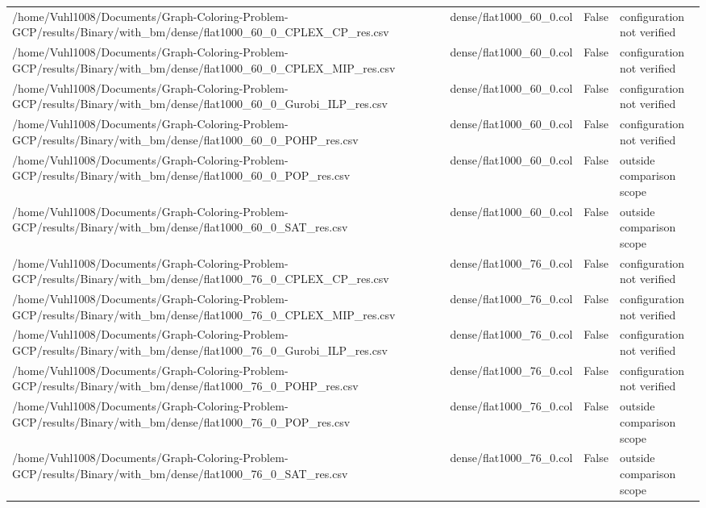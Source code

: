\begin{table}[htbp]
\begin{tabular}{llll}
/home/Vuhl1008/Documents/Graph-Coloring-Problem-GCP/results/Binary/with\_bm/dense/flat1000\_60\_0\_CPLEX\_CP\_res.csv & dense/flat1000\_60\_0.col & False & configuration not verified \\
/home/Vuhl1008/Documents/Graph-Coloring-Problem-GCP/results/Binary/with\_bm/dense/flat1000\_60\_0\_CPLEX\_MIP\_res.csv & dense/flat1000\_60\_0.col & False & configuration not verified \\
/home/Vuhl1008/Documents/Graph-Coloring-Problem-GCP/results/Binary/with\_bm/dense/flat1000\_60\_0\_Gurobi\_ILP\_res.csv & dense/flat1000\_60\_0.col & False & configuration not verified \\
/home/Vuhl1008/Documents/Graph-Coloring-Problem-GCP/results/Binary/with\_bm/dense/flat1000\_60\_0\_POHP\_res.csv & dense/flat1000\_60\_0.col & False & configuration not verified \\
/home/Vuhl1008/Documents/Graph-Coloring-Problem-GCP/results/Binary/with\_bm/dense/flat1000\_60\_0\_POP\_res.csv & dense/flat1000\_60\_0.col & False & outside comparison scope \\
/home/Vuhl1008/Documents/Graph-Coloring-Problem-GCP/results/Binary/with\_bm/dense/flat1000\_60\_0\_SAT\_res.csv & dense/flat1000\_60\_0.col & False & outside comparison scope \\
/home/Vuhl1008/Documents/Graph-Coloring-Problem-GCP/results/Binary/with\_bm/dense/flat1000\_76\_0\_CPLEX\_CP\_res.csv & dense/flat1000\_76\_0.col & False & configuration not verified \\
/home/Vuhl1008/Documents/Graph-Coloring-Problem-GCP/results/Binary/with\_bm/dense/flat1000\_76\_0\_CPLEX\_MIP\_res.csv & dense/flat1000\_76\_0.col & False & configuration not verified \\
/home/Vuhl1008/Documents/Graph-Coloring-Problem-GCP/results/Binary/with\_bm/dense/flat1000\_76\_0\_Gurobi\_ILP\_res.csv & dense/flat1000\_76\_0.col & False & configuration not verified \\
/home/Vuhl1008/Documents/Graph-Coloring-Problem-GCP/results/Binary/with\_bm/dense/flat1000\_76\_0\_POHP\_res.csv & dense/flat1000\_76\_0.col & False & configuration not verified \\
/home/Vuhl1008/Documents/Graph-Coloring-Problem-GCP/results/Binary/with\_bm/dense/flat1000\_76\_0\_POP\_res.csv & dense/flat1000\_76\_0.col & False & outside comparison scope \\
/home/Vuhl1008/Documents/Graph-Coloring-Problem-GCP/results/Binary/with\_bm/dense/flat1000\_76\_0\_SAT\_res.csv & dense/flat1000\_76\_0.col & False & outside comparison scope \\

\end{tabular}
\end{table}
